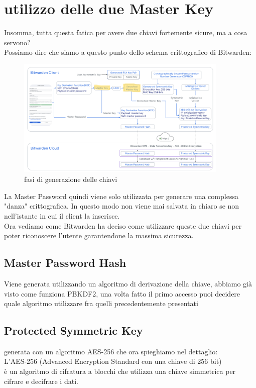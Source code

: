 \documentclass[a4paper,12pt]{report}
\begin{document}
			\section{utilizzo delle due Master Key}
			Insomma, tutta questa fatica per avere due chiavi fortemente sicure,
			ma a cosa servono?\\
			Possiamo dire che siamo a questo punto dello schema crittografico di Bitwarden:
			\begin{figure}[H]
				\centering
				\includegraphics[width=0.9\textwidth]{masterKeyGenerated.png}
				\caption{fasi di generazione delle chiavi}
				\label{fig:masterKey}
			\end{figure}
			La Master Password quindi viene solo utilizzata per generare una complessa
			"danza" crittografica. In questo modo non viene mai salvata in chiaro 
			se non nell'istante in cui il client la inserisce.\\
			Ora vediamo come Bitwarden ha deciso come utilizzare queste due chiavi
			per poter riconoscere l'utente garantendone la massima sicurezza.
			\subsection{Master Password Hash}
			 Viene generata utilizzando un algoritmo di derivazione della chiave, 
			 abbiamo già visto come funziona PBKDF2, una volta fatto il primo accesso
			 puoi decidere quale algoritmo utilizzare fra quelli precedentemente presentati
			\subsection{Protected Symmetric Key}
				generata con un algoritmo AES-256 che ora spieghiamo nel dettaglio:\\
				L'AES-256 (Advanced Encryption Standard con una chiave di 256
				bit)\\ è un algoritmo di cifratura a blocchi che utilizza una chiave
				simmetrica per cifrare e decifrare i dati.
				\newpage
\end{document}
